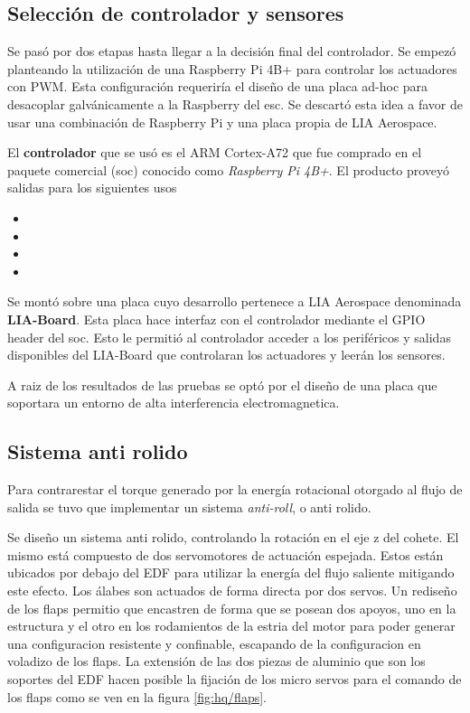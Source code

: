 \subsection{Selección de controlador y sensores}

Se pasó por dos etapas hasta llegar a la decisión final del controlador. Se empezó planteando la utilización de una Raspberry Pi 4B+ para controlar los actuadores con PWM. Esta configuración requeriría el diseño de una placa ad-hoc para desacoplar galvánicamente a la Raspberry del \gls{esc}. Se descartó esta idea a favor de usar una combinación de Raspberry Pi y una placa propia de LIA Aerospace.

\medskip

El \textbf{controlador} que se usó es el ARM Cortex-A72 que fue comprado en el paquete comercial (\gls{soc}) conocido como \textit{Raspberry Pi 4B+}. El producto proveyó salidas para los siguientes usos

\begin{itemize}
    \item {}
    \item {}
    \item {}
    \item {}
\end{itemize}

Se montó sobre una placa cuyo desarrollo pertenece a LIA Aerospace denominada \textbf{LIA-Board}. Esta placa hace interfaz con el controlador mediante el GPIO header del \gls{soc}. Esto le permitió al controlador acceder a los periféricos y salidas disponibles del LIA-Board que controlaran los actuadores y leerán los sensores.

\medskip


A raiz de los resultados de las pruebas se optó por el diseño de una placa que soportara
un entorno de alta interferencia electromagnetica. 


\subsection{Sistema anti rolido}

Para contrarestar el torque generado por la energía rotacional otorgado al flujo de salida se tuvo que implementar un sistema \textit{anti-roll}, o anti rolido.

\medskip

Se diseño un sistema anti rolido, controlando la rotación en el eje z del cohete. El mismo está compuesto de dos servomotores de actuación espejada. Estos están ubicados por debajo del EDF para utilizar la energía del flujo saliente mitigando este efecto. Los álabes son actuados de forma directa por dos servos. Un rediseño de los flaps permitio que encastren de forma que se posean dos
apoyos, uno en la estructura y el otro en los rodamientos de la estria del motor para poder generar una configuracion resistente y confinable, escapando de la configuracion en voladizo de los flaps. La extensión de las dos piezas de aluminio que son los
soportes del EDF hacen posible la fijación de los micro servos para el comando de los flaps como se ven en la figura \ref{fig:hq/flaps}.

